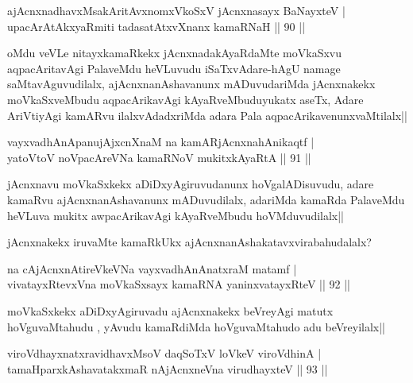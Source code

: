 \begin{shl}
ajAcnxnadhavxMsakAritAvxnomxVkoSxV jAcnxnasayx BaNayxteV |\\
upacArAtAkxyaRmiti tadasatAtxvXnanx kamaRNaH \hfill || 90 ||
\end{shl}

\begin{artha}
oMdu veVLe nitayxkamaRkekx jAcnxnadakAyaRdaMte moVkaSxvu aqpacAritavAgi PalaveMdu heVLuvudu iSaTxvAdare-hAgU namage saMtavAguvudilalx, ajAcnxnanAshavanunx mADuvudariMda jAcnxnakekx moVkaSxveMbudu aqpacArikavAgi kAyaRveMbuduyukatx aseTx, Adare AriVtiyAgi kamARvu ilalxvAdadxriMda adara Pala aqpacArikavenunxvaMtilalx||
\end{artha}

\begin{shl}
vayxvadhAnApanujAjxcnXnaM na kamARjAcnxnahAnikaqtf |\\
yatoV\s toV noVpacAreVNa kamaRNoV mukitxkAyaRtA \hfill || 91 ||
\end{shl}

\begin{artha}
jAcnxnavu moVkaSxkekx aDiDxyAgiruvudanunx hoVgalADisuvudu, adare kamaRvu ajAcnxnanAshavanunx mADuvudilalx, adariMda kamaRda PalaveMdu heVLuva mukitx awpacArikavAgi kAyaRveMbudu hoVMduvudilalx||
\end{artha}

\begin{artha}
jAcnxnakekx iruvaMte kamaRkUkx ajAcnxnanAshakatavxvirabahudalalx?
\end{artha}


\begin{shl}
na cAjAcnxnAtireVkeVNa vayxvadhAnAnatxraM matamf |\\
vivatayxRtevxVna moVkaSxsayx kamaRNA yaninxvatayxRteV \hfill || 92 ||
\end{shl}

\begin{artha}
moVkaSxkekx aDiDxyAgiruvadu ajAcnxnakekx beVreyAgi matutx hoVguvaMtahudu , yAvudu kamaRdiMda hoVguvaMtahudo adu beVreyilalx||
\end{artha}

\begin{shl}
viroVdhayxnatxravidhavxMsoV daqSoTxV loVkeV viroVdhinA |\\
tamaHparxkAshavatakxmaR nAjAcnxneVna virudhayxteV \hfill || 93 ||
\end{shl}

